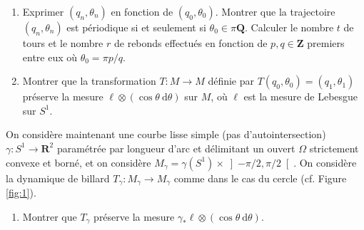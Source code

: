\documentclass[a4paper,10pt,openany]{article}
\theoremstyle{plain}
\theoremstyle{definition}
\newcommand{\dd}{\mathrm{d}}
\newcommand{\R}{\mathbf{R}}
\newcommand{\Q}{\mathbf{Q}}
\newcommand{\Z}{\mathbf{Z}}
\begin{document}
\begin{enumerate}
\item Exprimer $(q_n, \theta_n)$ en fonction de $(q_0, \theta_0)$. Montrer que la trajectoire $(q_n, \theta_n)$ est p\'eriodique si et seulement si $\theta_0 \in \pi \Q$. Calculer le nombre $t$ de tours et le nombre $r$ de rebonds effectu\'es en fonction de $p,q \in \Z$ premiers entre eux o\`u $\theta_0 = \pi p / q.$
\item Montrer que la transformation $T : M \to M$ d\'efinie par $T(q_0, \theta_0) = (q_1, \theta_1)$ pr\'eserve la mesure $\ell \otimes (\cos \theta~ \dd \theta)$ sur $M$, o\`u $\ell$ est la mesure de Lebesgue sur $S^1$.
\end{enumerate}
On consid\`ere maintenant une courbe lisse simple (pas d'autointersection) $\gamma : S^1 \to \R^2$ param\'etr\'ee par longueur d'arc et d\'elimitant un ouvert $\Omega$ strictement convexe et born\'e, et on consid\`ere $M_\gamma = \gamma(S^1) \times \left]-\pi/2, \pi/2 \right[$. On consid\`ere la dynamique de billard $T_\gamma : M_\gamma \to M_\gamma$ comme dans le cas du cercle (cf. Figure \ref{fig:1}).

\begin{enumerate}[resume]
\item Montrer que $T_\gamma$ pr\'eserve la mesure $\gamma_* \ell \otimes (\cos \theta ~\dd \theta)$.
\end{enumerate}
\end{document}

